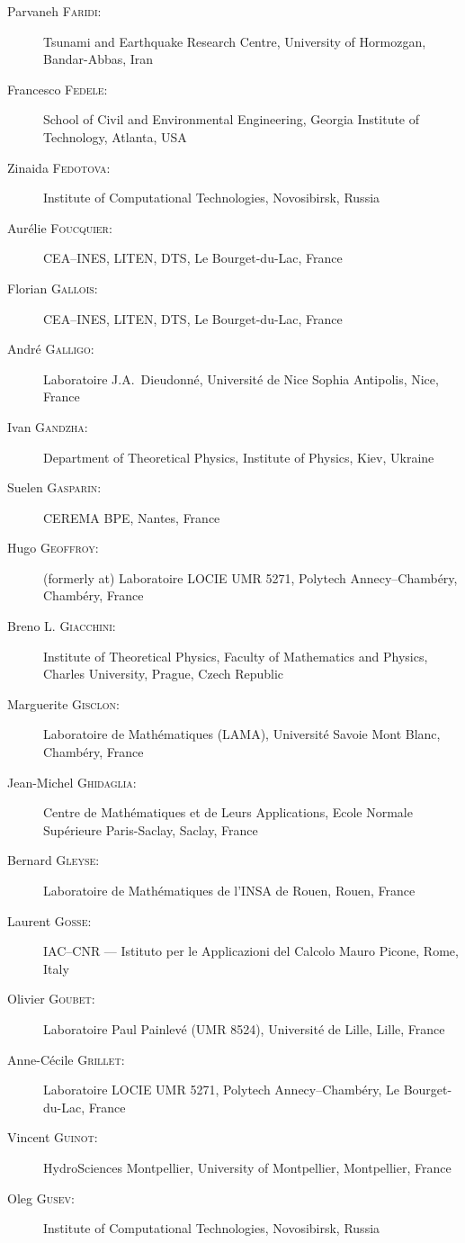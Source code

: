 \documentclass[final, a4paper, oneside, 12pt]{article}
\numberwithin{equation}{section}
\begin{document}
\begin{description}
  \item[Parvaneh \textsc{Faridi}:] Tsunami and Earthquake Research Centre, University of Hormozgan, Bandar-Abbas, Iran
  \item[Francesco \textsc{Fedele}:] School of Civil and Environmental Engineering, Georgia Institute of Technology, Atlanta, USA
  \item[Zinaida \textsc{Fedotova}:] Institute of Computational Technologies, Novosibirsk, Russia
  \item[Aur\'elie \textsc{Foucquier}:] CEA--INES, LITEN, DTS, Le Bourget-du-Lac, France
  \item[Florian \textsc{Gallois}:] CEA--INES, LITEN, DTS, Le Bourget-du-Lac, France
  \item[Andr\'e \textsc{Galligo}:] Laboratoire J.A.~Dieudonn\'e, Universit\'e de Nice Sophia Antipolis, Nice, France
  \item[Ivan \textsc{Gandzha}:] Department of Theoretical Physics, Institute of Physics, Kiev, Ukraine
  \item[Suelen \textsc{Gasparin}:] CEREMA BPE, Nantes, France
  \item[Hugo \textsc{Geoffroy}:] (formerly at) Laboratoire LOCIE UMR 5271, Polytech Annecy--Chamb\'ery, Chamb\'ery, France
  \item[Breno L. \textsc{Giacchini}:] Institute of Theoretical Physics, Faculty of Mathematics and Physics, Charles University, Prague, Czech Republic
  \item[Marguerite \textsc{Gisclon}:] Laboratoire de Math\'ematiques (LAMA), Universit\'e Savoie Mont Blanc, Chamb\'ery, France
  \item[Jean-Michel \textsc{Ghidaglia}:] Centre de Math\'ematiques et de Leurs Applications, Ecole Normale Sup\'erieure Paris-Saclay, Saclay, France
  \item[Bernard \textsc{Gleyse}:] Laboratoire de Math\'ematiques de l'INSA de Rouen, Rouen, France
  \item[Laurent \textsc{Gosse}:] IAC--CNR --- Istituto per le Applicazioni del Calcolo Mauro Picone, Rome, Italy
  \item[Olivier \textsc{Goubet}:] Laboratoire Paul Painlev\'e (UMR 8524), Universit\'e de Lille, Lille, France
  \item[Anne-C\'ecile \textsc{Grillet}:] Laboratoire LOCIE UMR 5271, Polytech Annecy--Chamb\'ery, Le Bourget-du-Lac, France
  \item[Vincent \textsc{Guinot}:] HydroSciences Montpellier, University of Montpellier, Montpellier, France
  \item[Oleg \textsc{Gusev}:] Institute of Computational Technologies, Novosibirsk, Russia

\end{description}
\end{document}
